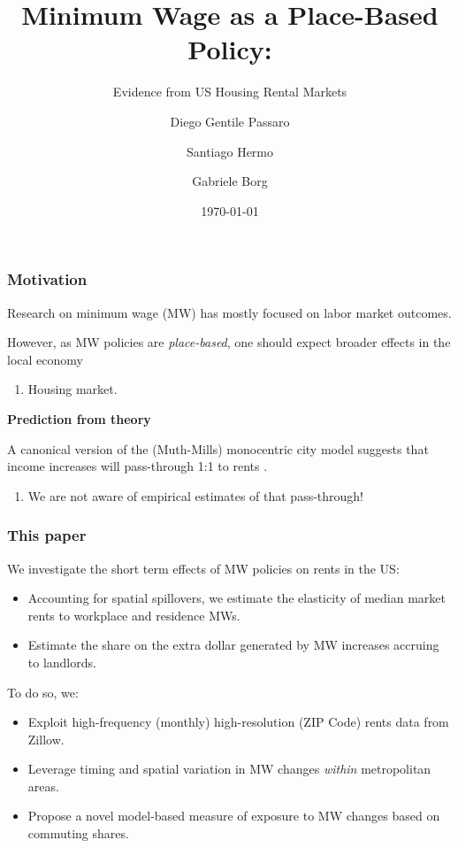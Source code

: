 \documentclass[aspectratio=169, t]{beamer}
\title{Minimum Wage as a Place-Based Policy:}
\subtitle{Evidence from US Housing Rental Markets}
\date{\today}
\author{Diego Gentile Passaro \and Santiago Hermo \and Gabriele Borg}
\institute{Brown University $ \quad\quad\quad\quad $ Brown University $ \quad\quad\quad\quad$  AWS}
\begin{document}
\maketitle



\begin{frame}
    \frametitle{Motivation}
    
    Research on minimum wage (MW) has mostly focused on labor market outcomes.
    
    \vspace{1.5mm}

    However, as MW policies are \textit{place-based}, one should expect broader effects 
    in the local economy
    \begin{enumerate}[$\Rightarrow $]
        \item Housing market.
    \end{enumerate}

    \pause
    \vspace{3mm}
    \textbf{Prediction from theory}
    
    A canonical version of the (Muth-Mills) monocentric city model suggests that income increases will 
    pass-through 1:1 to rents \parencite{Brueckner1987}.  
    \begin{enumerate}[$\Rightarrow $]
        \item We are not aware of empirical estimates of that pass-through!
    \end{enumerate}
\end{frame}

\begin{frame}
    \frametitle{This paper}
    We investigate the short term effects of MW policies on rents in the US:
    \begin{itemize}
        \vspace{.5mm} \item Accounting for spatial spillovers, we estimate 
        the elasticity of median market rents to workplace and residence MWs.
        \vspace{.5mm} \item Estimate the share on the extra dollar generated by
        MW increases accruing to landlords.
    \end{itemize}
    
    \vspace{3mm}
    \pause
    To do so, we:
    \begin{itemize}
        \vspace{.5mm} \item Exploit high-frequency (monthly) high-resolution 
        (ZIP Code) rents data from Zillow.
        \vspace{.5mm} \item Leverage timing and spatial variation in MW changes 
        \textit{within} metropolitan areas.
        \vspace{.5mm} \item Propose a novel model-based measure of exposure to MW 
        changes based on commuting shares.
    \end{itemize}
\end{frame}
\end{document}
